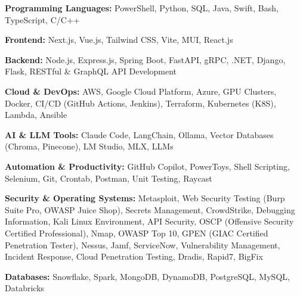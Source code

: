 \textbf{Programming Languages:} PowerShell, Python, SQL, Java, Swift, Bash, TypeScript, C/C++
\vspace{3pt}

\textbf{Frontend:} Next.js, Vue.js, Tailwind CSS, Vite, MUI, React.js
\vspace{3pt}

\textbf{Backend:} Node.js, Express.js, Spring Boot, FastAPI, gRPC, .NET, Django, Flask, RESTful \& GraphQL API Development
\vspace{3pt}

\textbf{Cloud \& DevOps:} AWS, Google Cloud Platform, Azure, GPU Clusters, Docker, CI/CD (GitHub Actions, Jenkins), Terraform, Kubernetes (K8S), Lambda, Ansible
\vspace{3pt}

\textbf{AI \& LLM Tools:} Claude Code, LangChain, Ollama, Vector Databases (Chroma, Pinecone), LM Studio, MLX, LLMs
\vspace{3pt}

\textbf{Automation \& Productivity:} GitHub Copilot, PowerToys, Shell Scripting, Selenium, Git, Crontab, Postman, Unit Testing, Raycast
\vspace{3pt}

\textbf{Security \& Operating Systems:} Metasploit, Web Security Testing (Burp Suite Pro, OWASP Juice Shop), Secrets Management, CrowdStrike, Debugging Information, Kali Linux Environment, API Security, OSCP (Offensive Security Certified Professional), Nmap, OWASP Top 10, GPEN (GIAC Certified Penetration Tester), Nessus, Jamf, ServiceNow, Vulnerability Management, Incident Response, Cloud Penetration Testing, Dradis, Rapid7, BigFix
\vspace{3pt}

\textbf{Databases:} Snowflake, Spark, MongoDB, DynamoDB, PostgreSQL, MySQL, Databricks